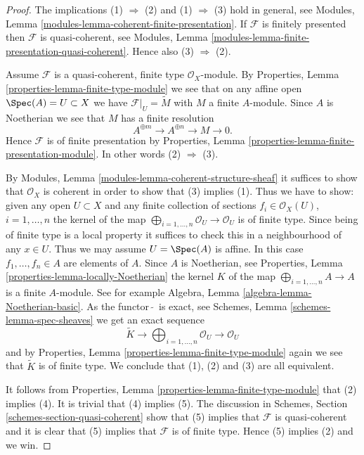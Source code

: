 \begin{proof}
The implications (1) $\Rightarrow$ (2) and (1) $\Rightarrow$ (3) hold
in general, see
Modules, Lemma \ref{modules-lemma-coherent-finite-presentation}.
If $\mathcal{F}$ is finitely presented then $\mathcal{F}$ is
quasi-coherent, see
Modules, Lemma \ref{modules-lemma-finite-presentation-quasi-coherent}.
Hence also (3) $\Rightarrow$ (2).

\medskip\noindent
Assume $\mathcal{F}$ is a quasi-coherent, finite type $\mathcal{O}_X$-module.
By
Properties, Lemma \ref{properties-lemma-finite-type-module}
we see that on any affine open
$\Spec(A) = U \subset X$ we have $\mathcal{F}|_U = \widetilde M$
with $M$ a finite $A$-module. Since $A$ is Noetherian we see that
$M$ has a finite resolution
$$
A^{\oplus m} \to A^{\oplus n} \to M \to 0.
$$
Hence $\mathcal{F}$ is of finite presentation by
Properties, Lemma \ref{properties-lemma-finite-presentation-module}.
In other words (2) $\Rightarrow$ (3).

\medskip\noindent
By Modules, Lemma \ref{modules-lemma-coherent-structure-sheaf} it suffices
to show that $\mathcal{O}_X$ is coherent in order to show that (3)
implies (1). Thus we have to show: given any open $U \subset X$ and
any finite collection of sections $f_i \in \mathcal{O}_X(U)$,
$i = 1, \ldots, n$ the kernel of the map
$\bigoplus_{i = 1, \ldots, n} \mathcal{O}_U \to \mathcal{O}_U$
is of finite type. Since being of finite type is a local property
it suffices to check this in a neighbourhood of any $x \in U$.
Thus we may assume $U = \Spec(A)$ is affine. In this case
$f_1, \ldots, f_n \in A$ are elements of $A$. Since $A$ is
Noetherian, see
Properties, Lemma \ref{properties-lemma-locally-Noetherian}
the kernel $K$ of the map $\bigoplus_{i = 1, \ldots, n} A \to A$
is a finite $A$-module. See for example
Algebra, Lemma \ref{algebra-lemma-Noetherian-basic}.
As the functor\ $\widetilde{ }$\ is exact, see
Schemes, Lemma \ref{schemes-lemma-spec-sheaves}
we get an exact sequence
$$
\widetilde K \to
\bigoplus\nolimits_{i = 1, \ldots, n} \mathcal{O}_U \to
\mathcal{O}_U
$$
and by
Properties, Lemma \ref{properties-lemma-finite-type-module}
again we see that $\widetilde K$ is of finite type. We conclude
that (1), (2) and (3) are all equivalent.

\medskip\noindent
It follows from
Properties, Lemma \ref{properties-lemma-finite-type-module}
that (2) implies (4). It is trivial that (4) implies (5).
The discussion in
Schemes, Section \ref{schemes-section-quasi-coherent}
show that (5) implies
that $\mathcal{F}$ is quasi-coherent and it is clear that (5)
implies that $\mathcal{F}$ is of finite type. Hence (5) implies
(2) and we win.
\end{proof}

